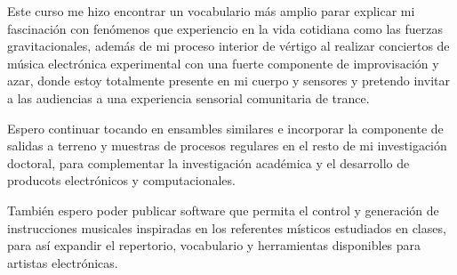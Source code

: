 \documentclass{article}
\begin{document}
Este curso me hizo encontrar un vocabulario más amplio parar explicar mi fascinación con fenómenos que experiencio en la vida cotidiana como las fuerzas gravitacionales, además de mi proceso interior de vértigo al realizar conciertos de música electrónica experimental con una fuerte componente de improvisación y azar, donde estoy totalmente presente en mi cuerpo y sensores y pretendo invitar a las audiencias a una experiencia sensorial comunitaria de trance.

Espero continuar tocando en ensambles similares e incorporar la componente de salidas a terreno y muestras de procesos regulares en el resto de mi investigación doctoral, para complementar la investigación académica y el desarrollo de producots electrónicos y computacionales.

También espero poder publicar software que permita el control y generación de instrucciones musicales inspiradas en los referentes místicos estudiados en clases, para así expandir el repertorio, vocabulario y herramientas disponibles para artistas electrónicas.

\clearpage

\printbibliography[title={Bibliografía}, heading=bibintoc]
\end{document}
